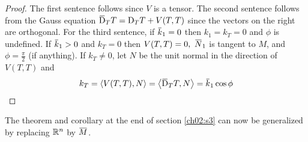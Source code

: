 \documentclass[../main]{subfiles}
\begin{document}
\begin{proof}
The first sentence follows since $V$ is a tensor. The second sentence follows from the Gauss equation
$\covariant_TT = \D_TT+V(T,T)$
since the vectors on the right are orthogonal. For the third sentence, if $\xoverline k_1=0$ then $k_1=k_T=0$ and $\phi$ is undefined. If $\xoverline k_1>0$ and $k_T=0$ then $V(T,T)=0,~\xoverline N_1$ is tangent to $M$, and $\phi=\frac\pi2$ (if anything). If $k_T\ne0$, let $N$ be the unit normal in the direction of $V(T,T)$ and
\[k_T = \ip{V(T,T)}{N} = \ip{\covariant_TT}{N} = \xoverline k_1\cos\phi\]
\end{proof}



The theorem and corollary at the end of section \ref{ch02:s3} can now be generalized by replacing $\mathbb{R}^n$ by $\xoverline M$.
\end{document}
